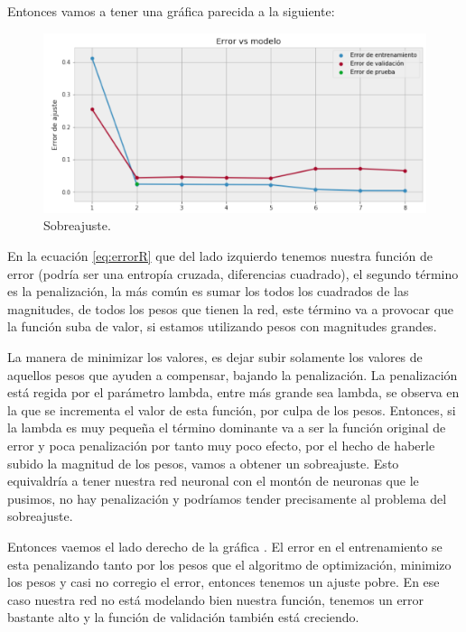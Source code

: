 Entonces vamos a tener una gráfica parecida a la siguiente:
  \begin{figure}[H]
   \centering
   \includegraphics[width=\textwidth ]{../Figuras/graficaOO.png}
   \caption{Sobreajuste.}
  \label{fig:grafica00}
  \end{figure}

 En la ecuación \ref{eq:errorR} que del lado izquierdo tenemos nuestra función de error (podría ser una entropía cruzada, diferencias cuadrado), el segundo término es la penalización, la más común es  sumar los todos los cuadrados de las magnitudes, de todos los pesos que tienen la red, este término va a provocar que la función suba de valor, si estamos utilizando pesos con magnitudes grandes. 
 
 La manera de minimizar los valores, es dejar subir solamente los valores de aquellos pesos que ayuden a compensar, bajando la penalización. La penalización está regida por el parámetro lambda, entre más grande sea lambda, se observa en la  que se incrementa el valor de esta función, por culpa de los pesos. Entonces, si la lambda es muy pequeña el término dominante va a ser la función original de error y poca penalización por tanto muy poco efecto, por el hecho de haberle subido la magnitud de los pesos, vamos a obtener un sobreajuste. Esto equivaldría a tener nuestra red neuronal con el montón de neuronas que le pusimos, no hay penalización y podríamos tender precisamente al problema del sobreajuste. 
 
 Entonces vaemos el lado derecho de la gráfica . El error en el entrenamiento se esta penalizando tanto por los pesos que el algoritmo de optimización, minimizo los pesos y casi no corregio el error, entonces tenemos un ajuste pobre. En ese caso  nuestra red  no está modelando bien nuestra función, tenemos un error bastante alto y la función de validación también está creciendo. 
 
